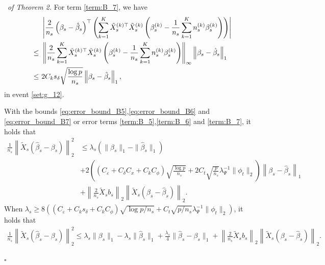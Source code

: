 \documentclass[12pt]{article}
\newenvironment{pf}{{\noindent \it Proof}\ }{\hfill $\square$\par}
\begin{document}
\begin{pf}{\it of Theorem 2. }
    For term \ref{term:B_7}, we have
    \begin{align}
        & \left|\frac{2}{n_s}\left(\beta_s - \hat{\beta}_s\right)^\top \left(\sum_{k=1}^K \tilde{X}_s^{(k)\top}\tilde{X}_s^{(k)}\left(\beta_s^{(k)}-\frac{1}{n_s}\sum_{k=1}^K n_s^{(k)}\beta_s^{(k)}\right)\right)\right| \notag\\ \le\ & 
        \left\|\frac{2}{n_s}\sum_{k=1}^K \tilde{X}_s^{(k)\top}\tilde{X}_s^{(k)}\left(\beta_s^{(k)}-\frac{1}{n_s}\sum_{k=1}^K n_s^{(k)}\beta_s^{(k)}\right)\right\|_{\infty}\left\|\beta_s - \hat{\beta}_s\right\|_1\notag\\ \le\ & 
      2C_k s_\delta \sqrt{\frac{\log p}{n_s}}\left\|\beta_s - \hat{\beta}_s\right\|_1\label{eq:error_bound_B7}, 
    \end{align}
    in event \ref{set:g_12}. 

    With the bounds \eqref{eq:error_bound_B5},\eqref{eq:error_bound_B6} and \eqref{eq:error_bound_B7} or error terms \ref{term:B_5},\ref{term:B_6} and \ref{term:B_7}, it holds that
    \begin{align*}
         \frac{1}{n_s}\left\|\tilde{X}_s\left(\hat{\beta}_s - \beta_s\right)\right\|_2^2 &\le \lambda_s\left(\|\beta_s\|_1 - \|\hat{\beta}_s\|_1\right) \\&+ 2\left(\left(C_\varepsilon +C_\delta C_x+C_kC_\phi\right)\sqrt{\frac{\log p}{n_s}}+   2C_t \sqrt{\frac{p}{n_s}}\lambda_\Psi^{-1} \|\phi_t\|_2\right)\left\|\beta_s - \hat{\beta}_s\right\|_1\\&+\left\|\frac{2}{n_s}\tilde{X}_s b_s\right\|_2\left\|\tilde{X}_s\left(\beta_s - \hat{\beta}_s\right)\right\|_2. 
    \end{align*}
    When $\lambda_s \ge 8\left(\left(C_\varepsilon +C_k s_\delta +C_kC_\phi \right)\sqrt{\log p/n_s}+ C_t\sqrt{p/n_s}\lambda^{-1}_\Psi\|\phi_t\|_2 \right)$, it holds that
    \begin{align}
        \frac{1}{n_s}\left\|\tilde{X}_s\left(\hat{\beta}_s - \beta_s\right)\right\|_2^2 \le \lambda_s\|\beta_s\|_1 - \lambda_s\|\hat{\beta}_s\|_1 +\frac{\lambda_s}{4}\|\hat{\beta}_s - \beta_s\|_1 + \left\|\frac{2}{n_s}\tilde{X}_s b_s\right\|_2\left\|\tilde{X}_s\left(\beta_s - \hat{\beta}_s\right)\right\|_2. \label{eq:confouning_lasso_inequality}
    \end{align}


\end{pf}
\end{document}
